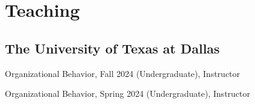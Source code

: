 \documentclass[12pt,letterpaper]{report} %
\newcommand{\listitemspace}{0.2em}
\renewenvironment{itemize}
{\begin{list}{}{\setlength{\leftmargin}{0em}
                \setlength{\parskip}{0em}
                \setlength{\itemsep}{\listitemspace}
                \setlength{\parsep}{\listitemspace}}}
{\end{list}}
\begin{document}













    \section*{Teaching}

    \subsection*{The University of Texas at Dallas}

    \begin{itemize}

    \item Organizational Behavior, Fall 2024 (Undergraduate), Instructor
    
    \item Organizational Behavior, Spring 2024 (Undergraduate), Instructor
        
    \end{itemize}
\end{document}
